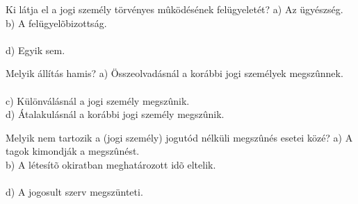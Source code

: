 \begin{frame}

\begin{tcolorbox}[title={52. Kérdés}]
Ki látja el a jogi személy törvényes mûködésének felügyeletét?
\tcblower
a) Az ügyészség.\\
b) A felügyelõbizottság.\\
\\
d) Egyik sem.
\end{tcolorbox}

\begin{tcolorbox}[title={53. Kérdés}]
Melyik állítás hamis?
\tcblower
a) Összeolvadásnál a korábbi jogi személyek megszûnnek.\\
\\
c) Különválásnál a jogi személy megszûnik.\\
d) Átalakulásnál a korábbi jogi személy megszûnik.
\end{tcolorbox}

\begin{tcolorbox}[title={54. Kérdés}]
Melyik nem tartozik a (jogi személy) jogutód nélküli megszûnés esetei közé?
\tcblower
a) A tagok kimondják a megszûnést.\\
b) A létesítõ okiratban meghatározott idõ eltelik.\\
\\
d) A jogosult szerv megszünteti.
\end{tcolorbox}

\end{frame}


